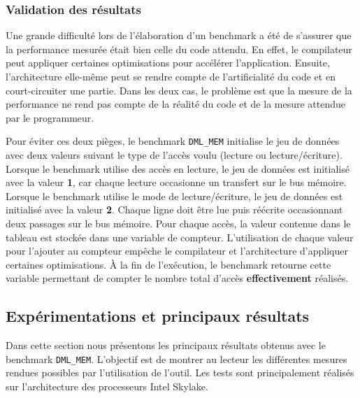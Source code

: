     
    \subsubsection{Validation des résultats} \label{sec:dml_init}

        Une grande difficulté lors de l'élaboration d'un benchmark a été de s'assurer que la performance mesurée était bien celle du code attendu. En effet, le compilateur peut appliquer certaines optimisations pour accélérer l'application. Ensuite, l'architecture elle-même peut se rendre compte de l'artificialité du code et en court-circuiter une partie. Dans les deux cas, le problème est que la mesure de la performance ne rend pas compte de la réalité du code et de la mesure attendue par le programmeur. 
        
        Pour éviter ces deux pièges, le benchmark \verb=DML_MEM= initialise le jeu de données avec deux valeurs suivant le type de l'accès voulu (lecture ou lecture/écriture). Lorsque le benchmark utilise des accès en lecture, le jeu de données est initialisé avec la valeur \textbf{1}, car chaque lecture occasionne un transfert sur le bus mémoire. 
        Lorsque le benchmark utilise le mode de lecture/écriture, le jeu de données est initialisé avec la valeur \textbf{2}. Chaque ligne doit être lue puis réécrite occasionnant deux passages sur le bus mémoire. Pour chaque accès, la valeur contenue dans le tableau est stockée dans une variable de compteur.  L'utilisation de chaque valeur pour l'ajouter au compteur empêche le compilateur et l'architecture d'appliquer certaines optimisations. À la fin de l'exécution, le benchmark retourne cette variable permettant de compter le nombre total d'accès \textbf{effectivement} réalisés.
        

    
    
    
    
    
    
    
    
\subsection{Expérimentations et principaux résultats}

    Dans cette section nous présentons les principaux résultats obtenus avec le benchmark \verb=DML_MEM=. L'objectif est de montrer au lecteur les différentes mesures rendues possibles par l'utilisation de l'outil. Les tests sont principalement réalisés sur l'architecture des processeurs Intel Skylake. 


